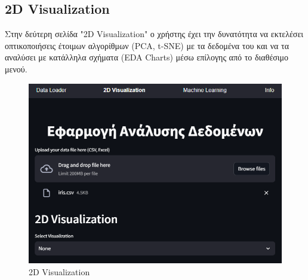 \documentclass{article}
\begin{document}
\subsection{2D Visualization}
Στην δεύτερη σελίδα "2D Visualization" ο χρήστης έχει την δυνατότητα να εκτελέσει οπτικοποιήσεις έτοιμων αλγορίθμων (PCA, t-SNE) με τα δεδομένα του και να τα αναλύσει με κατάλληλα σχήματα (EDA Charts) μέσω επίλογης από το διαθέσιμο μενού.
\begin{figure}[h!]
  \centering
  \includegraphics[width=0.6\textheight]{photos/2d_tab.png}
  \caption{2D Visualization}
  \label{fig:2DVisualization}
\end{figure}
\newpage
\end{document}
